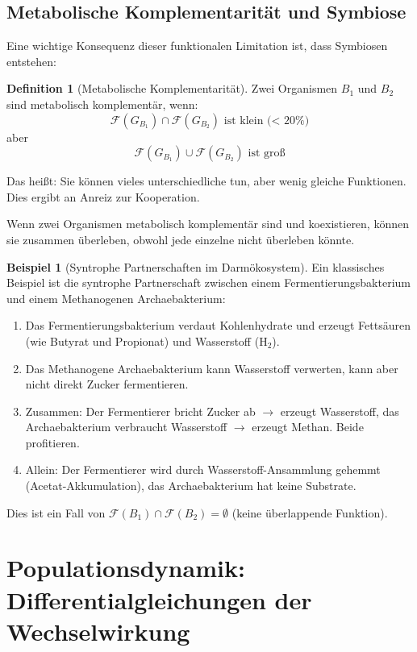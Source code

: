 \documentclass[a4paper,12pt]{article}
\theoremstyle{definition}
\newtheorem{definition}{Definition}
\newtheorem{beispiel}{Beispiel}
\begin{document}
\subsection{Metabolische Komplementarität und Symbiose}

Eine wichtige Konsequenz dieser funktionalen Limitation ist, dass Symbiosen entstehen:

\begin{definition}[Metabolische Komplementarität]
Zwei Organismen $B_1$ und $B_2$ sind metabolisch komplementär, wenn:
\[
\mathcal{F}(G_{B_1}) \cap \mathcal{F}(G_{B_2}) \text{ ist klein (< 20\%)}
\]
aber
\[
\mathcal{F}(G_{B_1}) \cup \mathcal{F}(G_{B_2}) \text{ ist groß}
\]

Das heißt: Sie können vieles unterschiedliche tun, aber wenig gleiche Funktionen. Dies ergibt an Anreiz zur Kooperation.
\end{definition}

Wenn zwei Organismen metabolisch komplementär sind und koexistieren, können sie zusammen überleben, obwohl jede einzelne nicht überleben könnte.

\begin{beispiel}[Syntrophe Partnerschaften im Darmökosystem]
Ein klassisches Beispiel ist die syntrophe Partnerschaft zwischen einem Fermentierungsbakterium und einem Methanogenen Archaebakterium:

\begin{enumerate}
    \item Das Fermentierungsbakterium verdaut Kohlenhydrate und erzeugt Fettsäuren (wie Butyrat und Propionat) und Wasserstoff ($\text{H}_2$).
    \item Das Methanogene Archaebakterium kann Wasserstoff verwerten, kann aber nicht direkt Zucker fermentieren.
    \item Zusammen: Der Fermentierer bricht Zucker ab $\to$ erzeugt Wasserstoff, das Archaebakterium verbraucht Wasserstoff $\to$ erzeugt Methan. Beide profitieren.
    \item Allein: Der Fermentierer wird durch Wasserstoff-Ansammlung gehemmt (Acetat-Akkumulation), das Archaebakterium hat keine Substrate.
\end{enumerate}

Dies ist ein Fall von $\mathcal{F}(B_1) \cap \mathcal{F}(B_2) = \emptyset$ (keine überlappende Funktion).
\end{beispiel}

\section{Populationsdynamik: Differentialgleichungen der Wechselwirkung}
\end{document}
